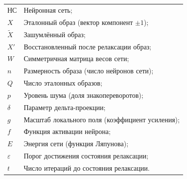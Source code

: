 
\noindent
\begin{tabular}{@{}p{2.6cm}@{\ \mdash\ }p{12.0cm}@{}}
НС & Нейронная сеть;\\
$X$ & Эталонный образ (вектор компонент $\pm 1$);\\
$\tilde{X}$ & Зашумлённый образ;\\
$X'$ & Восстановленный после релаксации образ;\\
$W$ & Симметричная матрица весов сети;\\
$n$ & Размерность образа (число нейронов сети);\\
$Q$ & Число эталонных образов;\\
$p$ & Уровень шума (доля знакопереворотов);\\
$\delta$ & Параметр дельта-проекции;\\
$g$ & Масштаб локального поля (коэффициент усиления);\\
$f$ & Функция активации нейрона;\\
$E$ & Энергия сети (функция Ляпунова);\\
$\varepsilon$ & Порог достижения состояния релаксации;\\
$t$ & Число итераций до состояния релаксации.
\end{tabular}
